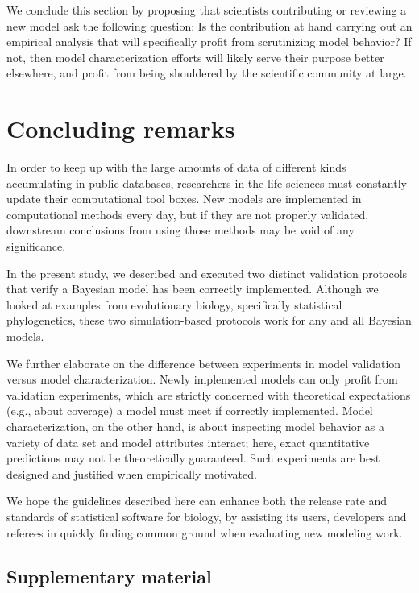 \documentclass[oneside]{article}
\begin{document}
We conclude this section by proposing that scientists contributing or reviewing a new model ask the following question: Is the contribution at hand carrying out an empirical analysis that will specifically profit from scrutinizing model behavior?
If not, then model characterization efforts will likely serve their purpose better elsewhere, and profit from being shouldered by the scientific community at large.


\section*{Concluding remarks}

In order to keep up with the large amounts of data of different kinds accumulating in public databases, researchers in the life sciences must constantly update their computational tool boxes.
New models are implemented in computational methods every day, but if they are not properly validated, downstream conclusions from using those methods may be void of any significance.

In the present study, we described and executed two distinct validation protocols that verify a Bayesian model has been correctly implemented.
Although we looked at examples from evolutionary biology, specifically statistical phylogenetics, these two simulation-based protocols work for any and all Bayesian models.

We further elaborate on the difference between experiments in model validation versus model characterization.
Newly implemented models can only profit from validation experiments, which are strictly concerned with theoretical expectations (e.g., about coverage) a model must meet if correctly implemented.
Model characterization, on the other hand, is about inspecting model behavior as a variety of data set and model attributes interact; here, exact quantitative predictions may not be theoretically guaranteed.
Such experiments are best designed and justified when empirically motivated.

We hope the guidelines described here can enhance both the release rate and standards of statistical software for biology, by assisting its users, developers and referees in quickly finding common ground when evaluating new modeling work.

\subsection*{Supplementary material}
\end{document}
